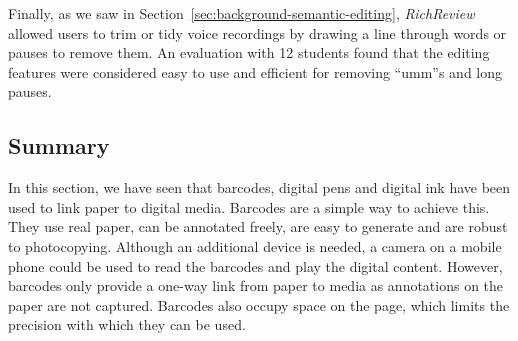


Finally, as we saw in Section~\ref{sec:background-semantic-editing}, \textit{RichReview} \citep{Yoon2014} allowed users
to trim or tidy voice recordings by drawing a line through words or pauses to remove them.  An evaluation with 12
students found that the editing features were considered easy to use and efficient for removing ``umm''s and long
pauses.

\subsection{Summary}
In this section, we have seen that barcodes, digital pens and digital ink have been used to link paper to digital
media.  Barcodes are a simple way to achieve this.  They use real paper, can be annotated freely, are easy to generate
and are robust to photocopying.  Although an additional device is needed, a camera on a mobile phone could be used to
read the barcodes and play the digital content.  However, barcodes only provide a one-way link from paper to media as
annotations on the paper are not captured.  Barcodes also occupy space on the page, which limits the precision with
which they can be used.


